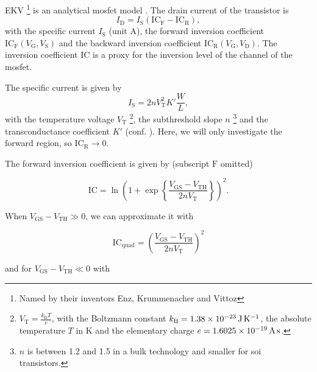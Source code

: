 \documentclass{article}[11pt]
\begin{document}
\notetitle

EKV%
\footnote{Named by their inventors Enz, Krummenacher and Vittoz}
is an analytical \gls{mosfet} model \cite{enz-ekv-90}.
The drain current of the transistor is
\begin{equation}
I_{\mathrm{D}} = I_{\mathrm{S}} \left(\mathrm{IC}_{\mathrm{F}}-\mathrm{IC}_{\mathrm{R}}\right),
\end{equation}
with the specific current $I_{\mathrm{S}}$ (unit A), the forward 
inversion coefficient 
$\mathrm{IC}_{\mathrm{F}}(V_{\mathrm{G}}, V_{\mathrm{S}})$ and 
the backward inversion coefficient 
$\mathrm{IC}_{\mathrm{R}}(V_{\mathrm{G}}, V_{\mathrm{D}})$.
The inversion coefficient $\mathrm{IC}$ is a proxy for the inversion level of 
the channel of the \gls{mosfet}.

\medskip

The specific current is given by
\begin{equation}
  I_{\mathrm{S}} = 2 n V_{\mathrm{T}}^2 K' \frac{W}{L},
\end{equation}
with the temperature voltage $V_{\mathrm{T}}$%
\footnote{$V_{\mathrm{T}}=\frac{k_{\mathrm{B}} T }{e}$, with the 
Boltzmann constant $k_{\mathrm{B}}=\SI{1.38d-23}{\joule\per\kelvin}$, 
the absolute temperature $T$ in \si{\kelvin} and the 
elementary charge $e=\SI{1.6025d-19}{\ampere\second}$.},
the subthreshold slope $n$%
\footnote{$n$ is between 1.2 and 1.5 in a bulk technology and smaller 
for \gls{soi} transistors\cite{jespers-gmid-17}.}
 and the transconductance coefficient $K'$ 
(conf. \cite{mosfet-square-law}).
Here, we will only investigate the forward region, so 
$\mathrm{IC}_{\mathrm{R}} \rightarrow 0$.

\medskip

The forward inversion coefficient is given by 
(subscript $\mathrm{F}$ omitted)

\begin{equation}\label{eq:ic}
  \mathrm{IC} = \ln\left(1+\exp\left\{\frac{V_{\mathrm{GS}}-V_{\mathrm{TH}}}{2 n V_{\mathrm{T}}}\right\}\right)^2.
\end{equation}


When $V_{\mathrm{GS}}-V_{\mathrm{TH}} \gg 0$, we can approximate 
it with

\begin{equation}\label{eq:ic-quad}
  \mathrm{IC}_{\mathrm{quad}} = \left(\frac{V_{\mathrm{GS}}-V_{\mathrm{TH}}}{2 n V_{\mathrm{T}}}\right)^2
\end{equation}

and for $V_{\mathrm{GS}}-V_{\mathrm{TH}} \ll 0$ with
\end{document}
